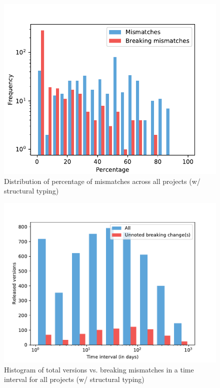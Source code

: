 \documentclass{l4proj}
\begin{document}
\begin{appendices}
\begin{figure}[]
\centering
\caption{Distribution of percentage of mismatches across all projects
(w/ structural typing)}
\label{StrDistributionAllProjects}
\includegraphics[height=0.4\textheight]
{images/evaluation/str_distribution_mismatches_all_projects}
\end{figure}

\begin{figure}[]
\centering
\caption{Histogram of total versions vs. breaking mismatches in a time
interval for all projects (w/ structural typing)}
\label{StrHistogramAllProjects}
\includegraphics[height=0.4\textheight]
{images/evaluation/ls_str_introduced_changes}
\end{figure}

\end{appendices}



\end{document}

